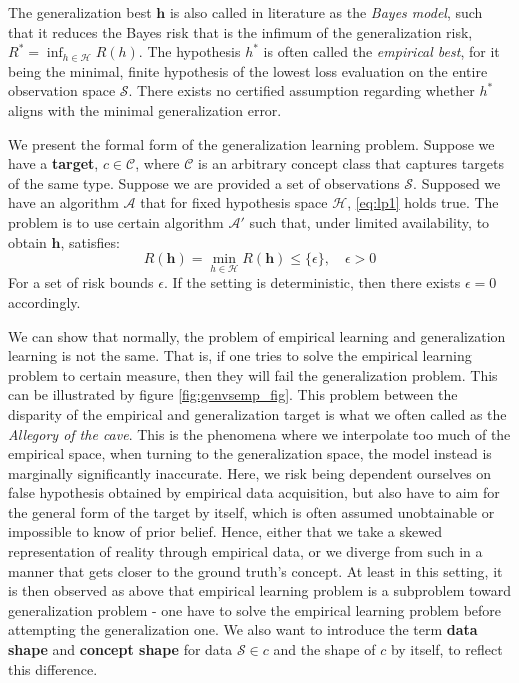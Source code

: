 The generalization best $\bm{h}$ is also called in literature as the \textit{Bayes model}, such that it reduces the Bayes risk that is the infimum of the generalization risk, $R^{*}=\inf_{h\in \mathcal{H}}R(h)$. The hypothesis $h^{*}$ is often called the \textit{empirical best}, for it being the minimal, finite hypothesis of the lowest loss evaluation on the entire observation space $\mathcal{S}$. There exists no certified assumption regarding whether $h^{*}$ aligns with the minimal generalization error.

\begin{definition}
    We present the formal form of the generalization learning problem. Suppose we have a \textbf{target}, $c\in\mathcal{C}$, where $\mathcal{C}$ is an arbitrary concept class that captures targets of the same type. Suppose we are provided a set of observations $\mathcal{S}$. Supposed we have an algorithm $\mathcal{A}$ that for fixed hypothesis space $\mathcal{H}$, \eqref{eq:lp1} holds true. The problem is to use certain algorithm $\mathcal{A}'$ such that, under limited availability, to obtain $\bm{h}$, satisfies: \begin{equation}
        R(\bm{h}) = \min_{h\in \mathcal{H}} R(\bm{h}) \leq \{\epsilon\}, \quad \epsilon > 0 
    \end{equation}
    For a set of risk bounds $\epsilon$. If the setting is deterministic, then there exists $\epsilon=0$ accordingly. 
\end{definition}

We can show that normally, the problem of empirical learning and generalization learning is not the same. That is, if one tries to solve the empirical learning problem to certain measure, then they will fail the generalization problem. This can be illustrated by figure \ref{fig:genvsemp_fig}. This problem between the disparity of the empirical and generalization target is what we often called as the \textit{Allegory of the cave}. This is the phenomena where we interpolate too much of the empirical space, when turning to the generalization space, the model instead is marginally significantly inaccurate. Here, we risk being dependent ourselves on false hypothesis obtained by empirical data acquisition, but also have to aim for the general form of the target by itself, which is often assumed unobtainable or impossible to know of prior belief. Hence, either that we take a skewed representation of reality through empirical data, or we diverge from such in a manner that gets closer to the ground truth's concept. At least in this setting, it is then observed as above that empirical learning problem is a subproblem toward generalization problem - one have to solve the empirical learning problem before attempting the generalization one. We also want to introduce the term \textbf{data shape} and \textbf{concept shape} for data $\mathcal{S}\in c$ and the shape of $c$ by itself, to reflect this difference. 

